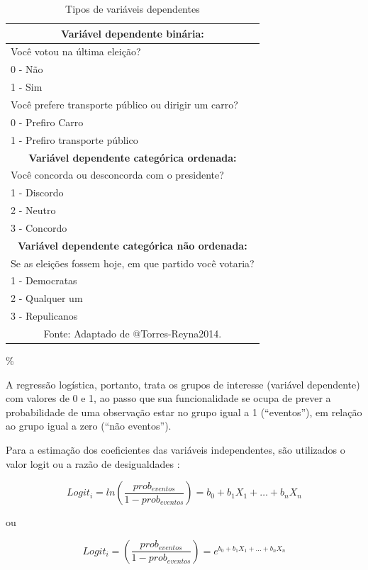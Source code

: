 \documentclass[12pt,brazil,]{book}
\begin{document}
\begin{table}[!h]
  \centering
  \caption{Tipos de variáveis dependentes}
    \begin{tabular}{|l|}
    \hline
    \multicolumn{1}{|c|}{\textbf{Variável dependente binária:}} \\
    \hline
    Você votou na última eleição? \\
    0 - Não \\
    1 - Sim \\
    \hline
    Você prefere transporte público ou dirigir um carro? \\
    0 - Prefiro Carro \\
    1 - Prefiro transporte público \\
    \hline
    \multicolumn{1}{|c|}{\textbf{Variável dependente categórica ordenada:}} \\
    \hline
    Você concorda ou desconcorda com o presidente? \\
    1 - Discordo \\
    2 - Neutro \\
    3 - Concordo \\
    \hline
    \multicolumn{1}{|c|}{\textbf{Variável dependente categórica não ordenada:}} \\
    \hline
    Se as eleições fossem hoje, em que partido você votaria?\\
    1 - Democratas \\
    2 - Qualquer um \\
    3 - Repulicanos \\
    \hline
    \multicolumn{1}{c}{Fonte: Adaptado de @Torres-Reyna2014.}
    \end{tabular}
  \label{tipos}
\end{table}

\%

A regressão logística, portanto, trata os grupos de interesse (variável
dependente) com valores de 0 e 1, ao passo que sua funcionalidade se
ocupa de prever a probabilidade de uma observação estar no grupo igual a
1 (``eventos''), em relação ao grupo igual a zero (``não eventos'').

Para a estimação dos coeficientes das variáveis independentes, são
utilizados o valor logit ou a razão de desigualdades
\textcite{Hair2009}:

\[
Logit_i=ln\left (\frac{prob_{eventos}}{1-prob_{eventos}}  \right )=b_0+b_1X_1+\ldots+b_nX_n
\]

ou

\[
Logit_i=\left (\frac{prob_{eventos}}{1-prob_{eventos}}  \right )=e^{b_0+b_1X_1+\ldots+b_nX_n}
\]
\end{document}
